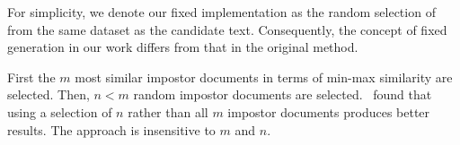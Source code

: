 For simplicity, we denote our fixed implementation as the random selection of \imps{} from the same dataset as the candidate text. 
Consequently, the concept of fixed \imp{} generation in our work differs from that in the original method.

First the $m$ most similar impostor documents in terms of min-max similarity are selected.
Then, $n < m$ random impostor documents are selected.
\citet{koppel_determining_2014}\ found that using a selection of $n$ \imps{} rather than all $m$ impostor documents produces better results.
The approach is insensitive to $m$ and $n$.